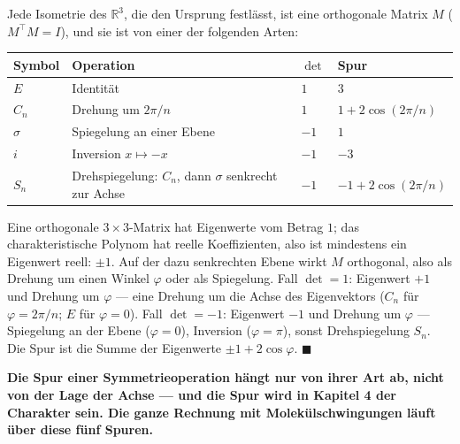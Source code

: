 \begin{merksatz}
Jede Isometrie des $\mathbb R^{3}$, die den Ursprung festlässt, ist eine orthogonale Matrix $M$ ($M^{\top}M = I$), und sie ist von einer der folgenden Arten:
\begin{center}
{\small
\renewcommand{\arraystretch}{1.5}
\begin{tabular}{@{}P{1.4cm}P{3.4cm}P{1.0cm}P{2.6cm}@{}}
\toprule
\textbf{Symbol} & \textbf{Operation} & $\det$ & \textbf{Spur}\\
\midrule
$E$ & Identität & $1$ & $3$\\
$C_n$ & Drehung um $2\pi/n$ & $1$ & $1 + 2\cos(2\pi/n)$\\
$\sigma$ & Spiegelung an einer Ebene & $-1$ & $1$\\
$i$ & Inversion $x\mapsto-x$ & $-1$ & $-3$\\
$S_n$ & Drehspiegelung: $C_n$, dann $\sigma$ senkrecht zur Achse & $-1$ & $-1 + 2\cos(2\pi/n)$\\
\bottomrule
\end{tabular}}
\end{center}

Eine orthogonale $3\times3$-Matrix hat Eigenwerte vom Betrag $1$; das charakteristische Polynom hat reelle Koeffizienten, also ist mindestens ein Eigenwert reell: $\pm1$. Auf der dazu senkrechten Ebene wirkt $M$ orthogonal, also als Drehung um einen Winkel $\varphi$ oder als Spiegelung. Fall $\det = 1$: Eigenwert $+1$ und Drehung um $\varphi$ --- eine Drehung um die Achse des Eigenvektors ($C_n$ für $\varphi = 2\pi/n$; $E$ für $\varphi = 0$). Fall $\det = -1$: Eigenwert $-1$ und Drehung um $\varphi$ --- Spiegelung an der Ebene ($\varphi = 0$), Inversion ($\varphi = \pi$), sonst Drehspiegelung $S_n$. Die Spur ist die Summe der Eigenwerte $\pm1 + 2\cos\varphi$. $\blacksquare$

\begin{center}
\begin{minipage}{0.9\textwidth}
\textbf{Die Spur einer Symmetrieoperation hängt nur von ihrer Art ab, nicht von der Lage der Achse --- und die Spur wird in Kapitel 4 der Charakter sein. Die ganze Rechnung mit Molekülschwingungen läuft über diese fünf Spuren.}
\end{minipage}
\end{center}


\end{merksatz}

